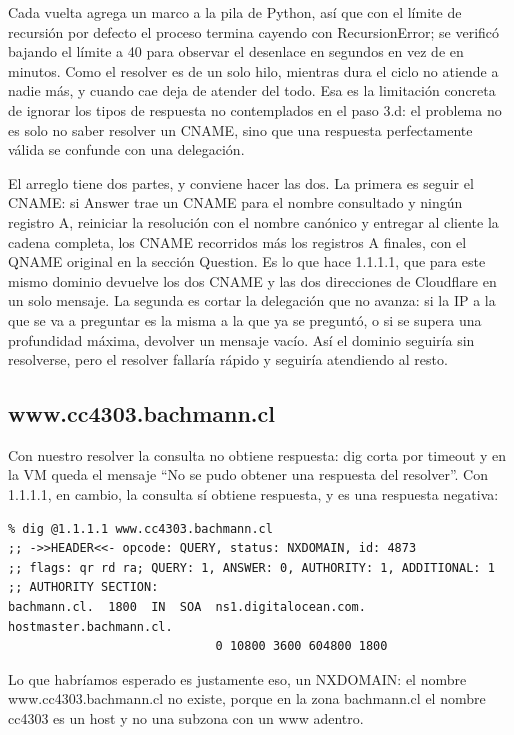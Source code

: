 \documentclass[
	spanish, %
	letterpaper, oneside
]{article}
\begin{document}
Cada vuelta agrega un marco a la pila de Python, así que con el límite de recursión por defecto el proceso termina cayendo con RecursionError; se verificó bajando el límite a 40 para observar el desenlace en segundos en vez de en minutos. Como el resolver es de un solo hilo, mientras dura el ciclo no atiende a nadie más, y cuando cae deja de atender del todo. Esa es la limitación concreta de ignorar los tipos de respuesta no contemplados en el paso 3.d: el problema no es solo no saber resolver un CNAME, sino que una respuesta perfectamente válida se confunde con una delegación.

El arreglo tiene dos partes, y conviene hacer las dos. La primera es seguir el CNAME: si Answer trae un CNAME para el nombre consultado y ningún registro A, reiniciar la resolución con el nombre canónico y entregar al cliente la cadena completa, los CNAME recorridos más los registros A finales, con el QNAME original en la sección Question. Es lo que hace 1.1.1.1, que para este mismo dominio devuelve los dos CNAME y las dos direcciones de Cloudflare en un solo mensaje. La segunda es cortar la delegación que no avanza: si la IP a la que se va a preguntar es la misma a la que ya se preguntó, o si se supera una profundidad máxima, devolver un mensaje vacío. Así el dominio seguiría sin resolverse, pero el resolver fallaría rápido y seguiría atendiendo al resto.

\subsection{www.cc4303.bachmann.cl}
Con nuestro resolver la consulta no obtiene respuesta: dig corta por timeout y en la VM queda el mensaje ``No se pudo obtener una respuesta del resolver''. Con 1.1.1.1, en cambio, la consulta sí obtiene respuesta, y es una respuesta negativa:

\begin{verbatim}
% dig @1.1.1.1 www.cc4303.bachmann.cl
;; ->>HEADER<<- opcode: QUERY, status: NXDOMAIN, id: 4873
;; flags: qr rd ra; QUERY: 1, ANSWER: 0, AUTHORITY: 1, ADDITIONAL: 1
;; AUTHORITY SECTION:
bachmann.cl.  1800  IN  SOA  ns1.digitalocean.com. hostmaster.bachmann.cl.
                             0 10800 3600 604800 1800
\end{verbatim}

Lo que habríamos esperado es justamente eso, un NXDOMAIN: el nombre www.cc4303.bachmann.cl no existe, porque en la zona bachmann.cl el nombre cc4303 es un host y no una subzona con un www adentro.
\end{document}
